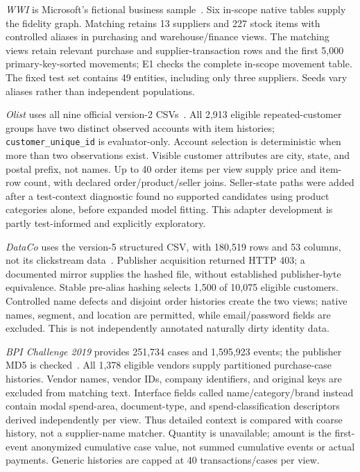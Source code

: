 \documentclass[conference,letterpaper]{IEEEtran}
\begin{document}
\emph{WWI} is Microsoft's fictional business sample~\cite{wwi}. Six in-scope native tables supply the fidelity graph. Matching retains 13 suppliers and 227 stock items with controlled aliases in purchasing and warehouse/finance views. The matching views retain relevant purchase and supplier-transaction rows and the first 5,000 primary-key-sorted movements; E1 checks the complete in-scope movement table. The fixed test set contains 49 entities, including only three suppliers. Seeds vary aliases rather than independent populations.

\emph{Olist} uses all nine official version-2 CSVs~\cite{olist}. All 2,913 eligible repeated-customer groups have two distinct observed accounts with item histories; \texttt{customer\_unique\_id} is evaluator-only. Account selection is deterministic when more than two observations exist. Visible customer attributes are city, state, and postal prefix, not names. Up to 40 order items per view supply price and item-row count, with declared order/product/seller joins. Seller-state paths were added after a test-context diagnostic found no supported candidates using product categories alone, before expanded model fitting. This adapter development is partly test-informed and explicitly exploratory.

\emph{DataCo} uses the version-5 structured CSV, with 180,519 rows and 53 columns, not its clickstream data~\cite{dataco}. Publisher acquisition returned HTTP 403; a documented mirror supplies the hashed file, without established publisher-byte equivalence. Stable pre-alias hashing selects 1,500 of 10,075 eligible customers. Controlled name defects and disjoint order histories create the two views; native names, segment, and location are permitted, while email/password fields are excluded. This is not independently annotated naturally dirty identity data.

\emph{BPI Challenge 2019} provides 251,734 cases and 1,595,923 events; the publisher MD5 is checked~\cite{bpi}. All 1,378 eligible vendors supply partitioned purchase-case histories. Vendor names, vendor IDs, company identifiers, and original keys are excluded from matching text. Interface fields called name/category/brand instead contain modal spend-area, document-type, and spend-classification descriptors derived independently per view. Thus detailed context is compared with coarse history, not a supplier-name matcher. Quantity is unavailable; amount is the first-event anonymized cumulative case value, not summed cumulative events or actual payments. Generic histories are capped at 40 transactions/cases per view.
\end{document}

